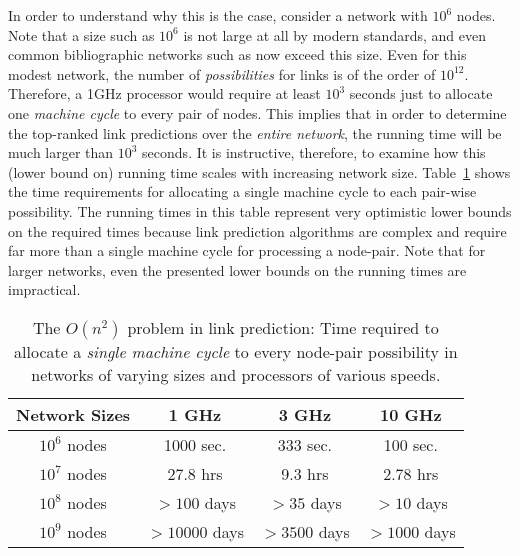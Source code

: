 In order to understand why this is the case,
consider a network with $10^6$ nodes. Note that a size such as
$10^6$ is not large at all by modern standards, and even common
bibliographic networks such as \DBLP now exceed this size. Even
for this modest network, the number of {\em possibilities} for links
is of the order of $10^{12}$. Therefore, a 1GHz processor would
require at least $10^3$ seconds just to allocate one {\em machine cycle} to
every pair of nodes. This implies that in order to determine the
top-ranked link predictions over the {\em entire network}, the
running time will be much larger than $10^3$ seconds.  It is
instructive, therefore, to examine how this (lower bound on) running
time scales with increasing network size. Table~\ref{time} shows the
time requirements for allocating a single machine cycle to each
pair-wise possibility. The running times in this table represent
very optimistic lower bounds on the required times because link
prediction algorithms are complex and require far more than a single
machine cycle for processing a node-pair. Note that for larger
networks, even the presented lower bounds on the running times are
impractical.
\begin{table}
\caption{The $O(n^2)$ problem in link prediction: Time required to
allocate a {\em single machine cycle} to every node-pair possibility
in networks of varying sizes and processors of various speeds.}
\label{time}
\vspace{-1ex}
\centering
\begin{tabular}{cccc}
\hline \hline Network Sizes & 1 GHz &  3 GHz & 10 GHz \\
\hline \hline $10^6$ nodes & 1000 sec. & 333 sec. & 100 sec.\\
\hline $10^7$ nodes & 27.8 hrs &  9.3 hrs &  2.78 hrs\\
\hline $10^8$ nodes & $>100$ days &  $>35$ days & $> 10$ days\\
\hline $10^9$ nodes & $>10000$ days & $>3500$ days & $> 1000$ days\\
\hline \hline
\end{tabular}
\vspace{-2ex}
\end{table}





